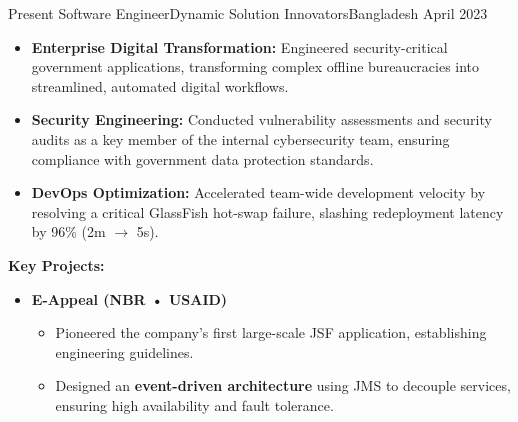 \begin{experiences}
  \experience
    {Present}   {Software Engineer}{Dynamic Solution Innovators}{Bangladesh}
    {April 2023} {
      \begin{itemize}
        \item \textbf{Enterprise Digital Transformation:} Engineered security-critical government applications, transforming complex offline bureaucracies into streamlined, automated digital workflows.
        \item \textbf{Security Engineering:} Conducted vulnerability assessments and security audits as a key member of the internal cybersecurity team, ensuring compliance with government data protection standards.
        \item \textbf{DevOps Optimization:} Accelerated team-wide development velocity by resolving a critical GlassFish hot-swap failure, slashing redeployment latency by 96\% (2m $\to$ 5s).
      \end{itemize}

    \vspace{0.5em}

      \textbf{Key Projects:}
      \begin{itemize}[leftmargin=1.3em,label={}]
        \vspace{0.3em}
        \item \textbf{E-Appeal (NBR • USAID)}
        \begin{itemize}
          \item Pioneered the company's first large-scale JSF application, establishing engineering guidelines.
          \item Designed an \textbf{event-driven architecture} using JMS to decouple services, ensuring high availability and fault tolerance.
        \end{itemize}


\end{itemize}}
\end{experiences}
